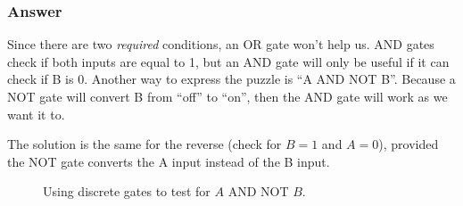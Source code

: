 \vfill 

\subsubsection*{Answer}

Since there are two \emph{required} conditions, an OR gate won't help us. 
AND gates check if both inputs are equal to 1, but an AND gate will only be useful if it can check if B is 0. 
Another way to express the puzzle is ``A AND NOT B''. 
Because a NOT gate will convert B from ``off'' to ``on'', then the AND gate will work as we want it to.

The solution is the same for the reverse (check for $B=1$ and $A=0$), provided the NOT gate converts the A input instead of the B input.


\begin{figure}[hb!]
\begin{center}



\caption{Using discrete gates to test for $A$ AND NOT $B$.}

\end{center}
\end{figure}

